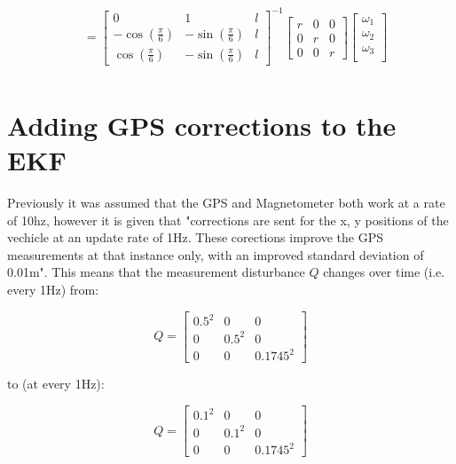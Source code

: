 \documentclass{article}
\begin{document}
\begin{align*}
		&=
			\begin{bmatrix}
				0 & 1 & l \\
				-\cos(\frac{\pi}{6}) & -\sin(\frac{\pi}{6}) & l \\
				\cos(\frac{\pi}{6}) & -\sin(\frac{\pi}{6}) & l
			\end{bmatrix}^{-1}
			\begin{bmatrix}
				r & 0 & 0 \\
				0 & r & 0 \\
				0 & 0 & r
			\end{bmatrix}
			\begin{bmatrix}
				\omega_{1} \\
				\omega_{2} \\
				\omega_{3} \\
			\end{bmatrix} \\
\end{align*}



\newpage
\section{Adding GPS corrections to the EKF}

Previously it was assumed that the GPS and Magnetometer both work at a rate of 
10hz, however it is given that "corrections are sent for the x, y positions of 
the vechicle at an update rate of 1Hz. These corections improve the GPS 
measurements at that instance only, with an improved standard deviation of 
0.01m". This means that the measurement disturbance $Q$ changes over time (i.e. 
every 1Hz) from:

\begin{equation}
	Q = 
	\begin{bmatrix}
		0.5^{2} & 0 & 0 \\
		0 & 0.5^{2} & 0 \\
		0 & 0 & 0.1745^{2}		
	\end{bmatrix}
\end{equation}

to (at every 1Hz):

\begin{equation}
	Q = 
	\begin{bmatrix}
		0.1^{2} & 0 & 0 \\
		0 & 0.1^{2} & 0 \\
		0 & 0 & 0.1745^{2}		
	\end{bmatrix}
\end{equation}
\end{document}
